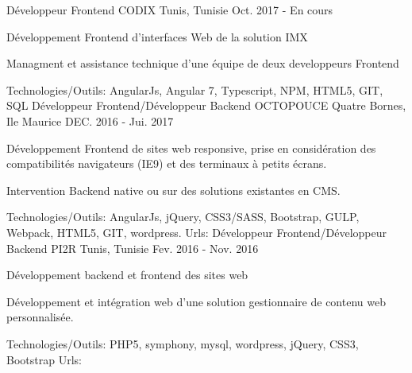 \begin{cventries}
  \techentries
    {Développeur Frontend}
    {CODIX}
    {Tunis, Tunisie}
    {Oct. 2017 - En cours}
    {
      \begin{cvitems}
		\item {Développement Frontend d'interfaces Web de la solution IMX }		
		\item {Managment et assistance technique d'une équipe de deux developpeurs Frontend}		
      \end{cvitems}
    }
    {\textcolor{awesome}{Technologies/Outils: } {\color{graytext}}  {AngularJs, Angular 7, Typescript, NPM, HTML5, GIT, SQL}}
	{} 
    { 
    }
  \techentries
    {Développeur Frontend/Développeur Backend}
    {OCTOPOUCE}
    {Quatre Bornes, Ile Maurice}
    {DEC. 2016 - Jui. 2017}
    {
      \begin{cvitems}
		\item {Développement Frontend de sites web responsive, prise en considération des compatibilités navigateurs (IE9) et des terminaux à petits écrans.}		
		\item {Intervention Backend native ou sur des solutions existantes en CMS.}
      \end{cvitems}
    }
    {\textcolor{awesome}{Technologies/Outils: } {\color{graytext}}  {AngularJs, jQuery, CSS3/SASS, Bootstrap, GULP, Webpack, HTML5, GIT, wordpress.}}
    {Urls:} 
    { \href{http://www.helloagency.com/}{} \break
     \href{http://anahita.mu/}{} \break
     \href{http://publicis-dashboard.octopouce.mu/en/}{}\break
    }
  \techentries
    {Développeur Frontend/Développeur Backend}
    {PI2R}
    {Tunis, Tunisie}
    {Fev. 2016 - Nov. 2016}
    {
      \begin{cvitems}
        \item {Développement backend et frontend des sites web }
        \item {Développement et intégration web d'une solution gestionnaire de contenu web personnalisée. }
      \end{cvitems}
    }
    {\textcolor{awesome}{Technologies/Outils: } {\color{graytext}}  {PHP5, symphony, mysql, wordpress, jQuery, CSS3, Bootstrap}}
    {Urls:} 
    {\href{http://www.ozeol.com/en/}{} \break
}
\end{cventries}
